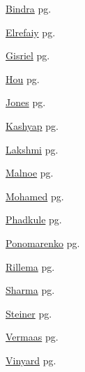 \item \hyperlink{Bindra.1}{Bindra} pg. \pageref{abs:Bindra}
\item \hyperlink{Elrefaiy.1}{Elrefaiy} pg. \pageref{abs:Elrefaiy}
\item \hyperlink{Gisriel.1}{Gisriel} pg. \pageref{abs:Gisriel}
\item \hyperlink{Hou.1}{Hou} pg. \pageref{abs:Hou}
\item \hyperlink{Jones.1}{Jones} pg. \pageref{abs:Jones}
\item \hyperlink{Kashyap.1}{Kashyap} pg. \pageref{abs:Kashyap}
\item \hyperlink{Lakshmi.1}{Lakshmi} pg. \pageref{abs:Lakshmi}
\item \hyperlink{Malnoe.1}{Malnoe} pg. \pageref{abs:Malnoe}
\item \hyperlink{Mohamed.1}{Mohamed} pg. \pageref{abs:Mohamed}
\item \hyperlink{Phadkule.1}{Phadkule} pg. \pageref{abs:Phadkule}
\item \hyperlink{Ponomarenko.1}{Ponomarenko} pg. \pageref{abs:Ponomarenko}
\item \hyperlink{Rillema.1}{Rillema} pg. \pageref{abs:Rillema}
\item \hyperlink{Sharma.1}{Sharma} pg. \pageref{abs:Sharma}
\item \hyperlink{Steiner.1}{Steiner} pg. \pageref{abs:Steiner}
\item \hyperlink{Vermaas.1}{Vermaas} pg. \pageref{abs:Vermaas}
\item \hyperlink{Vinyard.1}{Vinyard} pg. \pageref{abs:Vinyard}
